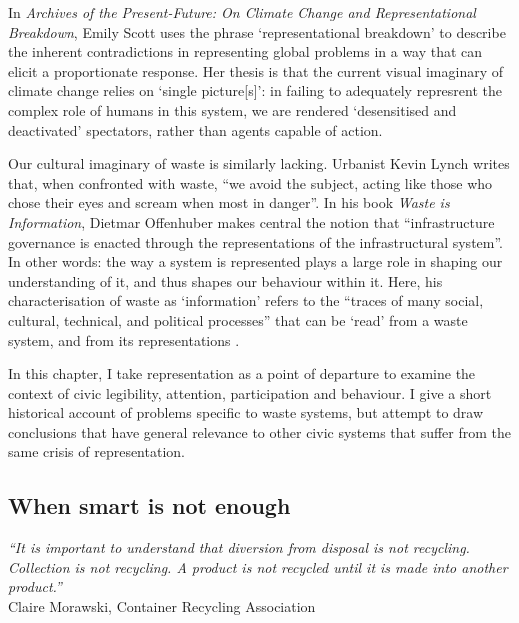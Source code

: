 \documentclass[nofonts,nols,justified,nobib]{tufte-book}
\begin{document}
In \emph{Archives of the Present-Future: On Climate Change and Representational Breakdown}, Emily Scott uses the phrase `representational breakdown' to describe the inherent contradictions in representing global problems in a way that can elicit a proportionate response. Her thesis is that the current visual imaginary of climate change relies on `single picture[s]': in failing to adequately represrent the complex role of humans in this system, we are rendered `desensitised and deactivated' spectators, rather than agents capable of action.

Our cultural imaginary of waste is similarly lacking. Urbanist Kevin Lynch writes that, when confronted with waste, ``we avoid the subject, acting like those who chose their eyes and scream when most in danger''. In his book \emph{Waste is Information}, Dietmar Offenhuber makes central the notion that ``infrastructure governance is enacted through the representations of the infrastructural system''. In other words: the way a system is represented plays a large role in shaping our understanding of it, and thus shapes our behaviour within it. Here, his characterisation of waste as `information' refers to the ``traces of many social, cultural, technical, and political processes'' that can be `read' from a waste system, and from its representations \cite{offenhuber_waste_2017}. 

In this chapter, I take representation as a point of departure to examine the context of civic legibility, attention, participation and behaviour. I give a short historical account of problems specific to waste systems, but attempt to draw conclusions that have general relevance to other civic systems that suffer from the same crisis of representation.


\subsection*{When smart is not enough}

\begin{flushright}
\begin{flushright}
\emph{``It is important to understand that diversion from disposal is not recycling. Collection is not recycling. A product is not recycled until it is made into another product.''}\cite{morawski_understanding_2009}\\
Claire Morawski, Container Recycling Association
\end{flushright}
\end{flushright}
\end{document}
